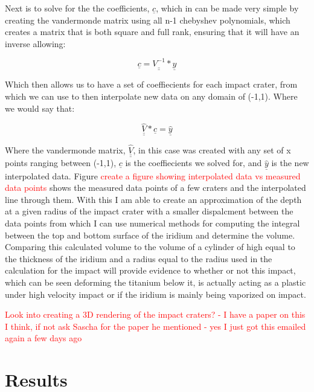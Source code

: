 \documentclass[review]{elsarticle}
\def\doubleunderline#1{\underline{\underline{#1}}}
\begin{document}
		Next is to solve for the the coefficients, $\underline{c}$, which in can be made very simple by creating the vandermonde matrix using all n-1 chebyshev polynomials, which creates a matrix that is both square
		and full rank, ensuring that it will have an inverse allowing:

		\begin{equation}
		    \underline{c} = \doubleunderline{V^{-1}}*\underline{y}
			\label{eq:Linear_system2}
		\end{equation}
		 
		Which then allows us to have a set of coeffiecients for each impact crater, from which we can use to then interpolate new data on any domain of (-1,1). Where we would say that:


		\begin{equation}
		    \doubleunderline{\hat V}*\underline{c} = \underline{\hat y}
			\label{eq:Linear_system3}
		\end{equation}

		Where the vandermonde matrix, $\doubleunderline{\hat V}$, in this case was created with any set of x points ranging between (-1,1), $\underline{c}$ is the coeffiecients we solved for, and $\underline{\hat y}$ 
		is the new interpolated data. Figure \textcolor{red}{create a figure showing interpolated data vs measured data points} shows the measured data points of a few craters and the interpolated line through them. 
		With this I am able to create an approximation of the depth at a given radius of the impact crater with a smaller dispalcment between the data points from which I can use numerical methods for computing the
		integral between the top and bottom surface of the iridium and determine the volume. Comparing this calculated volume to the volume of a cylinder of high equal to the thickness of the iridium and a radius 
		equal to the radius used in the calculation for the impact will provide evidence to whether or not this impact, which can be seen deforming the titanium below it, is actually acting as a plastic under high 
		velocity impact or if the iridium is mainly being vaporized on impact.

		\textcolor{red}{Look into creating a 3D rendering of the impact craters? - I have a paper on this I think, if not ask Sascha for the paper he mentioned - yes I just got this emailed again a few days ago}



 
	\section{Results}
		
\end{document}
